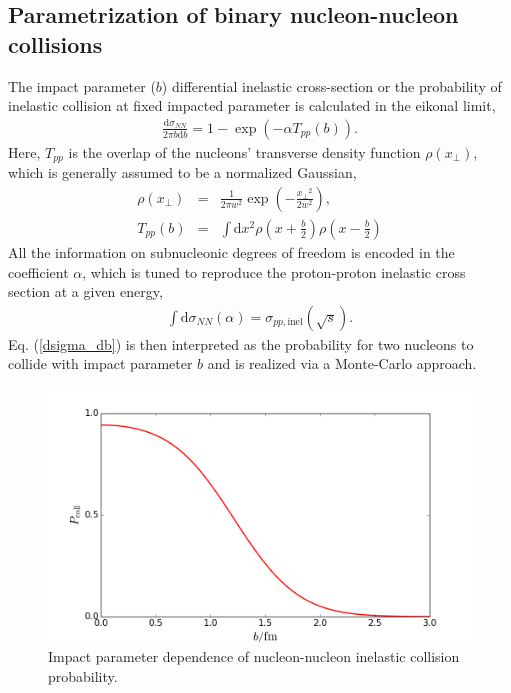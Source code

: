 \documentclass[aps,prl,twocolumn,groupedaddress]{revtex4-1}
\begin{document}
	\subsection{Parametrization of binary nucleon-nucleon collisions}
	The impact parameter ($b$) differential inelastic cross-section or the probability of inelastic collision at fixed impacted parameter is calculated in the eikonal limit,
	\begin{eqnarray}\label{dsigma_db}
		\frac{\mathrm{d}\sigma_{NN}}{2\pi b \mathrm{d}b} = 1 - \exp\left(-\alpha T_{pp} (b)\right).
	\end{eqnarray}
Here, $T_{pp}$ is the overlap of the nucleons' transverse density function $\rho(x_\perp)$, which is generally assumed to be a normalized Gaussian,
	\begin{eqnarray}
		\rho(x_\perp) &=& \frac{1}{2\pi w^2}\exp\left(-\frac{{x_\perp}^2}{2w^2}\right), \\
		T_{pp}(b) &=& \int \mathrm{d}{x}^2 \rho(x+\frac{b}{2})\rho(x-\frac{b}{2})
	\end{eqnarray}
	All the information on subnucleonic degrees of freedom is encoded in the coefficient $\alpha$, which is tuned to reproduce the proton-proton inelastic cross section at a given energy,
	\begin{eqnarray}
		\int \mathrm{d}\sigma_{NN}(\alpha) = \sigma_{pp, \textrm{inel}}(\sqrt{s}).
	\end{eqnarray}
	Eq. (\ref{dsigma_db}) is then interpreted as the probability for two nucleons to collide with impact parameter $b$ and is realized via a Monte-Carlo approach.
	\begin{figure}
	\begin{center}
	\includegraphics[width=\columnwidth]{pics/Pcoll.png}
	\caption{Impact parameter dependence of nucleon-nucleon inelastic collision probability.}
	\end{center}
	\end{figure}
\end{document}
